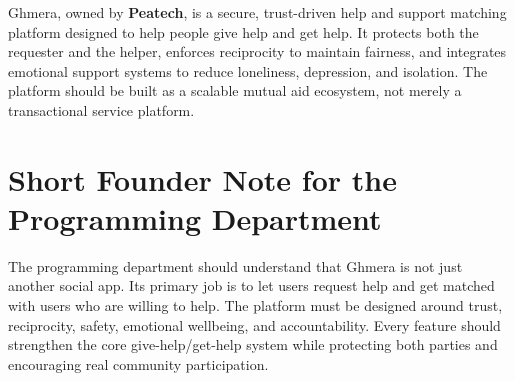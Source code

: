 \documentclass[11pt]{article}
\begin{document}
Ghmera, owned by \textbf{Peatech}, is a secure, trust-driven help and support matching platform designed to help people give help and get help. It protects both the requester and the helper, enforces reciprocity to maintain fairness, and integrates emotional support systems to reduce loneliness, depression, and isolation. The platform should be built as a scalable mutual aid ecosystem, not merely a transactional service platform.

\section{Short Founder Note for the Programming Department}

The programming department should understand that Ghmera is not just another social app. Its primary job is to let users request help and get matched with users who are willing to help. The platform must be designed around trust, reciprocity, safety, emotional wellbeing, and accountability. Every feature should strengthen the core give-help/get-help system while protecting both parties and encouraging real community participation.
\end{document}
